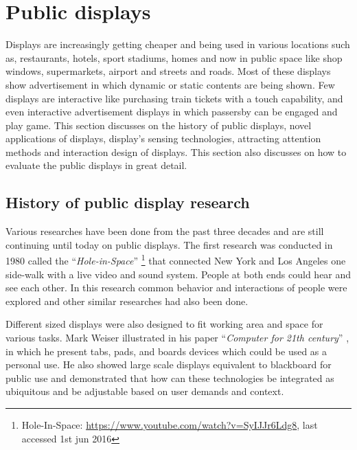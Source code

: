 \section{Public displays}
Displays are increasingly getting cheaper and being used in various locations such as, restaurants, hotels, sport stadiums, homes and now in public space like shop windows, supermarkets, airport and streets and roads. Most of these displays show advertisement in which dynamic or static contents are being shown. Few displays are interactive like purchasing train tickets with a touch capability, and even interactive advertisement displays in which passersby can be engaged and play game. 
This section discusses on the history of public displays, novel applications of displays, display’s sensing technologies, attracting attention methods and interaction design of displays. This section also discusses on how to evaluate the public displays in great detail. 





\subsection{History of public display research}
Various researches have been done from the past three decades and are still continuing until today on public displays. The first research was conducted in 1980 called the ``\emph{Hole-in-Space}'' \footnote{Hole-In-Space: \url{https://www.youtube.com/watch?v=SyIJJr6Ldg8}, last accessed 1st jun 2016} that connected New York and Los Angeles one side-walk with a live video and sound system. People at both ends could hear and see each other. In this research common behavior and interactions of people were explored and other similar researches had also been done.

Different sized displays were also designed to fit working area and space for various tasks. Mark Weiser illustrated in his paper ``\emph{Computer for 21th century}'' \cite{newgenerationcomputer}, in which he present tabs, pads, and boards devices which could be used as a personal use. He also showed large scale displays equivalent to blackboard for public use and demonstrated that how can these technologies be integrated as ubiquitous and be adjustable based on user demands and context. 

